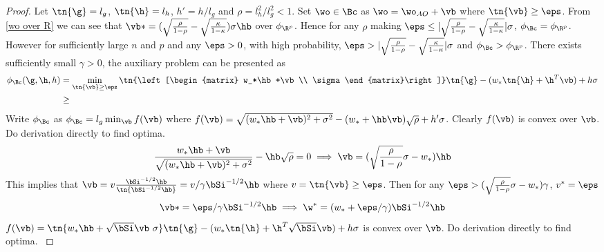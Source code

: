 \begin{proof}
Let $\tn{\g}=l_g$, $\tn{\h}=l_h$, $h'=h/l_g$ and $\rho=l_h^2/l_g^2<1$. Set $\wo\in\Bc$ as $\wo=\wo_{AO}+\vb$ where $\tn{\vb}\geq\eps$. From \ref{wo over R} we can see that $\vb*=(\sqrt{\frac{\rho}{1-\rho}}-\sqrt{\frac{\kappa}{1-\kappa}})\sigma\hb$ over $\phi_{\R^p}$. Hence for any $\rho$ making $\eps\leq|\sqrt{\frac{\rho}{1-\rho}}-\sqrt{\frac{\kappa}{1-\kappa}}|\sigma$, $\phi_{\Bc}=\phi_{\R^p}$. However for sufficiently large $n$ and $p$ and any $\eps>0$, with high probability, $\eps>|\sqrt{\frac{\rho}{1-\rho}}-\sqrt{\frac{\kappa}{1-\kappa}}|\sigma$ and $\phi_{\Bc}>\phi_{\R^p}$. There exists sufficiently small $\gamma>0$, the auxiliary problem can be presented as 
\begin{align}
\phi_{\Bc}(\g,\h,h)&=\min_{\tn{\vb}\geq\eps}\tn{\left[\begin{matrix}
    w_*\hb+\vb  \\
    \sigma 
\end{matrix}\right]}\tn{\g}-(w_*\tn{\h}+\h^T\vb)+h\sigma\\
&\geq
\end{align}
Write $\phi_{\Bc}$ as $\phi_{\Bc}=l_g\min_{\vb}f(\vb)$ where $f(\vb)=\sqrt{(w_*\hb+\vb)^2+\sigma^2}-(w_*+\hb\vb)\sqrt{\rho}+h'\sigma$. Clearly $f(\vb)$ is convex over $\vb$. Do derivation directly to find optima.
\begin{align}
    \frac{w_*\hb+\vb}{\sqrt{(w_*\hb+\vb)^2+\sigma^2}}-\hb\sqrt{\rho}=0\implies \vb=(\sqrt{\frac{\rho}{1-\rho}}\sigma-w_*)\hb
\end{align}
This implies that $\vb=v\frac{\bSi^{-1/2}\hb}{\tn{\bSi^{-1/2}\hb}}=v/\gamma\bSi^{-1/2}\hb$ where $v=\tn{\vb}\geq\eps$. Then for any  $\eps>(\sqrt{\frac{\rho}{1-\rho}}\sigma-w_*)\gamma$, $v^*=\eps$
\[
\vb*=\eps/\gamma\bSi^{-1/2}\hb\implies\w^*=(w_*+\eps/\gamma)\bSi^{-1/2}\hb
\]
{\color{red}
$f(\vb)=\tn{w_*\hb+\sqrt{\bSi}\vb~\sigma}\tn{\g}-(w_*\tn{\h}+\h^T\sqrt{\bSi}\vb)+h\sigma$ is convex over $\vb$. Do derivation directly to find optima.
}

\end{proof}
